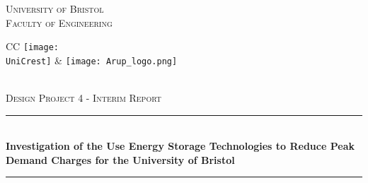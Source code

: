 \documentclass[10pt]{article}
\newcommand{\AssignmentTitle}{Investigation of the Use Energy Storage Technologies to Reduce Peak Demand Charges for the University of Bristol}
\newcommand{\ModuleTitle}{Design Project 4 - Interim Report}
\newcommand{\University}{University of Bristol}
\newcommand{\Faculty}{Faculty of Engineering}
\newcommand{\UniCrest}{crestbris.png}
\newcommand{\horrule}[1]{\rule{\linewidth}{#1}}
\begin{document}
  \setlength{\abovedisplayskip}{-18pt}
  \setlength{\belowdisplayskip}{0pt}
  \setlength{\abovedisplayshortskip}{-18pt}
  \setlength{\belowdisplayshortskip}{0pt}



\begin{titlepage}

	\center %
		\normalfont \normalsize \textsc{\University} \\ [10pt]
		\normalfont \normalsize \textsc{\Faculty} \\ [25pt]
\begin{tabular}{CC}
  \texttt{[image: \\UniCrest]} &   \texttt{[image: Arup\_logo.png]}
\end{tabular}\\[0.5cm]
		\normalfont \normalsize \textsc{\ModuleTitle} \\ [25pt]
		\horrule{0.5pt} \\[0.4cm]
		\huge \textbf{\AssignmentTitle} \\
		\horrule{2pt} \\[0.5cm]

\end{titlepage}
\end{document}
